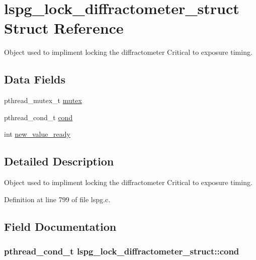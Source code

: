 \hypertarget{structlspg__lock__diffractometer__struct}{
\section{lspg\_\-lock\_\-diffractometer\_\-struct Struct Reference}
\label{structlspg__lock__diffractometer__struct}
}


Object used to impliment locking the diffractometer Critical to exposure timing.  
\subsection*{Data Fields}
\begin{DoxyCompactItemize}
\item 
pthread\_\-mutex\_\-t \hyperlink{structlspg__lock__diffractometer__struct_a362e848dfd1551428b8d12d8776fd2ed}{mutex}
\item 
pthread\_\-cond\_\-t \hyperlink{structlspg__lock__diffractometer__struct_a7614c802af37c1d3358479a2c13ac898}{cond}
\item 
int \hyperlink{structlspg__lock__diffractometer__struct_ae94acdf44008ce48930e3083f08f5b6c}{new\_\-value\_\-ready}
\end{DoxyCompactItemize}


\subsection{Detailed Description}
Object used to impliment locking the diffractometer Critical to exposure timing. 

Definition at line 799 of file lspg.c.

\subsection{Field Documentation}
\hypertarget{structlspg__lock__diffractometer__struct_a7614c802af37c1d3358479a2c13ac898}{
\subsubsection[{cond}]{\setlength{\rightskip}{0pt plus 5cm}pthread\_\-cond\_\-t {\bf lspg\_\-lock\_\-diffractometer\_\-struct::cond}}}
\label{structlspg__lock__diffractometer__struct_a7614c802af37c1d3358479a2c13ac898}


